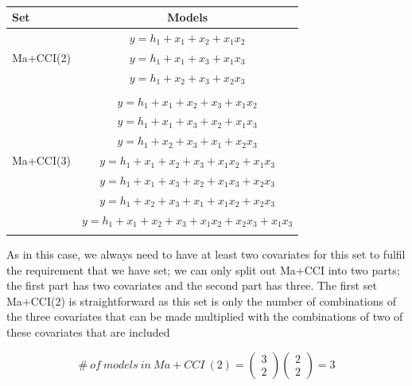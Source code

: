 \begin{table}
\caption{}
\begin{tabular}{lc} 
\toprule
Set & Models \\ 
\midrule
\multirow{3}{*}{Ma+CCI(2)} & $y=h_1+x_1+x_2+x_1x_2$\\ & $y=h_1+x_1+x_3+x_1x_3$\\ & $y=h_1+x_2+x_3+x_2x_3$\\ &  \\  
\multirow{7}{*}{Ma+CCI(3)} & $y=h_1+x_1+x_2+x_3+x_1x_2$\\ & $y=h_1+x_1+x_3+x_2+x_1x_3$\\ & $y=h_1+x_2+x_3+x_1+x_2x_3$\\ & $y=h_1+x_1+x_2+x_3+x_1x_2+x_1x_3$\\ & $y=h_1+x_1+x_3+x_2+x_1x_3+x_2x_3$\\ & $y=h_1+x_2+x_3+x_1+x_1x_2+x_2x_3$\\ & $y=h_1+x_1+x_2+x_3+x_1x_2+x_2x_3+x_1x_3$\\ & \\ 
\bottomrule
\end{tabular}
\end{table}



As in this case, we always need to have at least two covariates for this set to fulfil the requirement that we have set; we can only split out Ma+CCI into two parts; the first part has two covariates and the second part has three. The first set Ma+CCI(2) is straightforward as this set is only the number of combinations of the three covariates that can be made multiplied with the combinations of two of these covariates that are included

\noindent 
\[\#\ of\ models\ in\ Ma+CCI\ \left(2\right)=\left( \begin{array}{c}
3 \\ 
2 \end{array}
\right)\left( \begin{array}{c}
2 \\ 
2 \end{array}
\right)=3\] 

